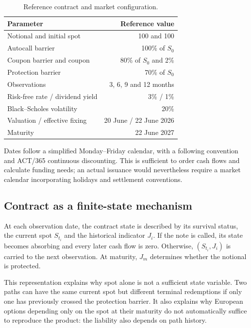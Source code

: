 \documentclass[12pt,a4paper]{article}
\newcommand{\1}{\mathbf{1}}
\begin{document}
\begin{table}[H]
\centering
\begin{tabular}{lr}
\toprule
Parameter & Reference value \\
\midrule
Notional and initial spot & 100 and 100 \\
Autocall barrier & 100\% of $S_0$ \\
Coupon barrier and coupon & 80\% of $S_0$ and 2\% \\
Protection barrier & 70\% of $S_0$ \\
Observations & 3, 6, 9 and 12 months \\
Risk-free rate / dividend yield & 3\% / 1\% \\
Black--Scholes volatility & 20\% \\
Valuation / effective fixing & 20 June / 22 June 2026 \\
Maturity & 22 June 2027 \\
\bottomrule
\end{tabular}
\caption{Reference contract and market configuration.}
\label{tab:contract}
\end{table}

Dates follow a simplified Monday--Friday calendar, with a following convention
and ACT/365 continuous discounting. This is sufficient to order cash flows and
calculate funding needs; an actual issuance would nevertheless require a market
calendar incorporating holidays and settlement conventions.

\subsection{Contract as a finite-state mechanism}

At each observation date, the contract state is described by its survival
status, the current spot $S_{t_i}$ and the historical indicator $J_i$. If the
note is called, its state becomes absorbing and every later cash flow is zero.
Otherwise, $(S_{t_i},J_i)$ is carried to the next observation. At maturity,
$J_m$ determines whether the notional is protected.

This representation explains why spot alone is not a sufficient state
variable. Two paths can have the same current spot but different terminal
redemptions if only one has previously crossed the protection barrier. It also
explains why European options depending only on the spot at their maturity do
not automatically suffice to reproduce the product: the liability also depends
on path history.
\end{document}
